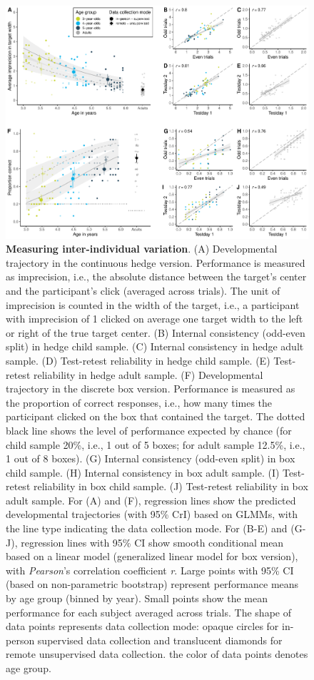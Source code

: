 \documentclass[
  man,floatsintext]{apa6}
\begin{document}
\begin{figure}

{\centering \includegraphics[width=1\linewidth]{../figures/tango_arrangedplot} 

}

\caption{\textbf{Measuring inter-individual variation}. (A) Developmental trajectory in the continuous hedge version. Performance is measured as imprecision, i.e., the absolute distance between the target's center and the participant's click (averaged across trials). The unit of imprecision is counted in the width of the target, i.e., a participant with imprecision of 1 clicked on average one target width to the left or right of the true target center. (B) Internal consistency (odd-even split) in hedge child sample. (C) Internal consistency in hedge adult sample. (D) Test-retest reliability in hedge child sample. (E) Test-retest reliability in hedge adult sample. (F) Developmental trajectory in the discrete box version. Performance is measured as the proportion of correct responses, i.e., how many times the participant clicked on the box that contained the target. The dotted black line shows the level of performance expected by chance (for child sample 20\%, i.e., 1 out of 5 boxes; for adult sample 12.5\%, i.e., 1 out of 8 boxes). (G) Internal consistency (odd-even split) in box child sample. (H) Internal consistency in box adult sample. (I) Test-retest reliability in box child sample. (J) Test-retest reliability in box adult sample. For (A) and (F), regression lines show the predicted developmental trajectories (with 95\% CrI) based on GLMMs, with the line type indicating the data collection mode. For (B-E) and (G-J), regression lines with 95\% CI show smooth conditional mean based on a linear model (generalized linear model for box version), with \emph{Pearson}'s correlation coefficient \emph{r}. Large points with 95\% CI (based on non-parametric bootstrap) represent performance means by age group (binned by year). Small points show the mean performance for each subject averaged across trials. The shape of data points represents data collection mode: opaque circles for in-person supervised data collection and translucent diamonds for remote unsupervised data collection. the color of data points denotes age group.}\label{fig:fig2}
\end{figure}
\end{document}
